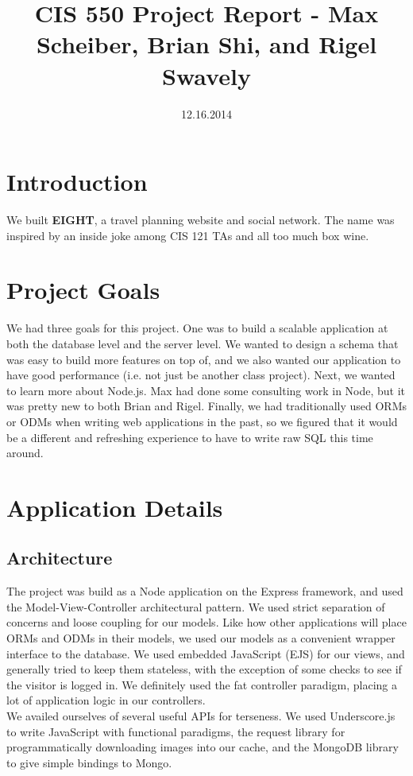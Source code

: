 \documentclass[11pt]{amsart}
\title{CIS 550 Project Report - Max Scheiber, Brian Shi, and Rigel Swavely}
\date{12.16.2014}
\begin{document}
\maketitle
\section{Introduction}
We built {\bf EIGHT}, a travel planning website and social network. The name was inspired by an
inside joke among CIS 121 TAs and all too much box wine.

\section{Project Goals}
We had three goals for this project. One was to build a scalable application at both the
database level and the server level. We wanted to design a schema that was easy to build more
features on top of, and we also wanted our application to have good performance (i.e. not just
be another class project). Next, we wanted to learn more about Node.js. Max had done some
consulting work in Node, but it was pretty new to both Brian and Rigel. Finally, we had
traditionally used ORMs or ODMs when writing web applications in the past, so we figured
that it would be a different and refreshing experience to have to write raw SQL this time around.

\section{Application Details}
\subsection{Architecture}
The project was build as a Node application on the Express framework, and used the Model-View-Controller 
architectural pattern. We used strict separation of concerns and loose coupling for our models. Like
how other applications will place ORMs and ODMs in their models, we used our models as a convenient
wrapper interface to the database. We used embedded JavaScript (EJS) for our views, and generally tried
to keep them stateless, with the exception of some checks to see if the visitor is logged in. We
definitely used the fat controller paradigm, placing a lot of application logic in our controllers. \\

We availed ourselves of several useful APIs for terseness. We used Underscore.js to write JavaScript
with functional paradigms, the request library for programmatically downloading images into our
cache, and the MongoDB library to give simple bindings to Mongo. \\
\end{document}
